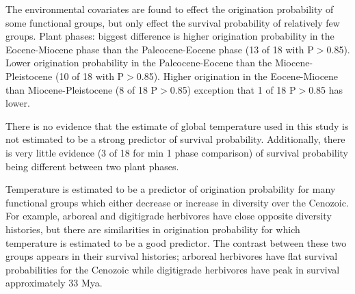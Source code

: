 \documentclass[12pt,letterpaper]{article}
\begin{document}


The environmental covariates are found to effect the origination probability of some functional groups, but only effect the survival probability of relatively few groups. Plant phases: biggest difference is higher origination probability in the Eocene-Miocene phase than the Paleocene-Eocene phase (13 of 18 with P\(>0\).85). Lower origination probability in the Paleocene-Eocene than the Miocene-Pleistocene (10 of 18 with P\(>\)0.85). Higher origination in the Eocene-Miocene than Miocene-Pleistocene (8 of 18 P\(>\)0.85) exception that 1 of 18 P\(>\)0.85 has lower.

There is no evidence that the estimate of global temperature used in this study is not estimated to be a strong predictor of survival probability. Additionally, there is very little evidence (3 of 18 for min 1 phase comparison) of survival probability being different between two plant phases. 

Temperature is estimated to be a predictor of origination probability for many functional groups which either decrease or increase in diversity over the Cenozoic. For example, arboreal and digitigrade herbivores have close opposite diversity histories, but there are similarities in origination probability for which temperature is estimated to be a good predictor. The contrast between these two groups appears in their survival histories; arboreal herbivores have flat survival probabilities for the Cenozoic while digitigrade herbivores have peak in survival approximately 33 Mya.
\end{document}
